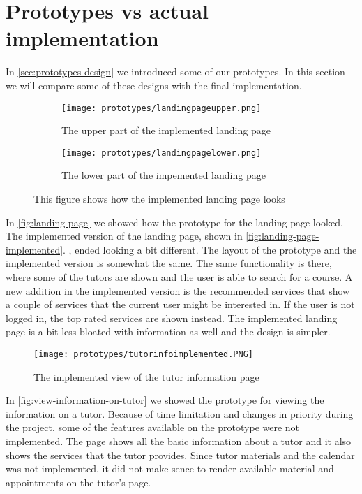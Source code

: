 \section{Prototypes vs actual implementation}
In \autoref{sec:prototypes-design} we introduced some of our prototypes.
In this section we will compare some of these designs with the final implementation.

\begin{figure}[H]
    \begin{subfigure}{0.5\textwidth}
    \texttt{[image: prototypes/landingpageupper.png]} 
    \caption{The upper part of the implemented landing page}
    \label{fig:landing-page-upper}
    \end{subfigure}
    \begin{subfigure}{0.5\textwidth}
        \texttt{[image: prototypes/landingpagelower.png]}
    \caption{The lower part of the impemented landing page}
    \label{fig:landing-page-lower}
    \end{subfigure} 
    \caption{This figure shows how the implemented landing page looks}
    \label{fig:landing-page-implemented}
\end{figure}
\noindent
In \autoref{fig:landing-page} we showed how the prototype for the landing page looked.
The implemented version of the landing page, shown in \autoref{fig:landing-page-implemented}. , ended looking a bit different.
The layout of the prototype and the implemented version is somewhat the same. 
The same functionality is there, where some of the tutors are shown and the user is able to search for a course. 
A new addition in the implemented version is the recommended services that show a couple of services that the current user might be interested in. 
If the user is not logged in, the top rated services are shown instead. 
The implemented landing page is a bit less bloated with information as well and the design is simpler.

\begin{figure}[H]
    \texttt{[image: prototypes/tutorinfoimplemented.PNG]} 
    \caption{The implemented view of the tutor information page}
    \label{fig:tutor-info-implemented}
\end{figure}
\noindent
In \autoref{fig:view-information-on-tutor} we showed the prototype for viewing the information on a tutor.
Because of time limitation and changes in priority during the project, some of the features available on the prototype were not implemented. The page shows all the basic information about a tutor and it also shows the services that the tutor provides.
Since tutor materials and the calendar was not implemented, it did not make sence to render available material and appointments on the tutor's page.
